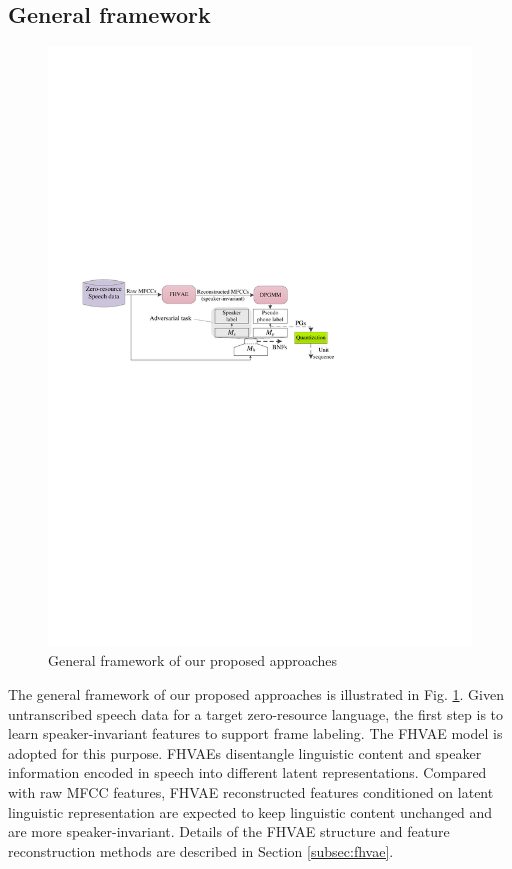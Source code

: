 \documentclass[a4paper]{article}
\begin{document}
\subsection{General framework}
\begin{figure}[t]
    \centering
    \includegraphics[width=0.85 \linewidth]{LaTeX/general_framework.pdf}
    \caption{General framework of our proposed approaches}
    \label{fig:framework}
\end{figure}
The general framework of our proposed approaches is illustrated in Fig. \ref{fig:framework}. Given untranscribed speech data for a target zero-resource language, the first step is to learn speaker-invariant features   to support frame labeling. The FHVAE model \cite{hsu2017nips} is adopted for this purpose. FHVAEs disentangle linguistic content and speaker information encoded in speech into different latent representations. 
Compared with raw MFCC features, FHVAE reconstructed features conditioned on latent linguistic representation are expected to keep linguistic content unchanged and are more speaker-invariant. 
Details of the FHVAE structure and feature reconstruction methods are described in Section \ref{subsec:fhvae}.
\end{document}
